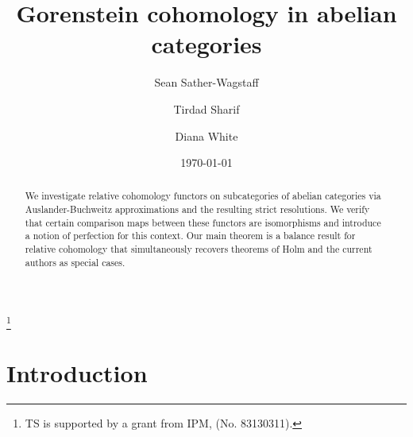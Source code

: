 \documentclass{amsart}
\begin{document}


\author{Sean Sather-Wagstaff}

\address{Sean Sather-Wagstaff, Department of Mathematical Sciences, Kent State University,
  Mathematics and Computer Science Building, Summit Street, Kent OH
  44242, USA}

\author{Tirdad Sharif}
\address{Tirdad Sharif, School of Mathematics, Institute for Studies in
Theoretical Physics and Mathematics, P. O. Box 19395-5746, Tehran, Iran}
\thanks{TS is supported by a grant from IPM, (No. 83130311).}

\author{Diana White} 
\address{Diana White, Department of Mathematics, University of Nebraska,
   203 Avery Hall, Lincoln, NE, 68588-0130 USA} 

\title{Gorenstein cohomology in abelian categories}

\date{\today}


\begin{abstract}
We investigate relative cohomology functors 
on subcategories of abelian categories
via Auslander-Buchweitz approximations
and the resulting strict resolutions.  
We verify that certain comparison maps between these functors are isomorphisms
and introduce a notion of perfection for this context.
Our main theorem is a balance result 
for relative cohomology that simultaneously
recovers theorems of Holm and the current authors as special cases.
\end{abstract}

\maketitle

\section*{Introduction} 
\end{document}
